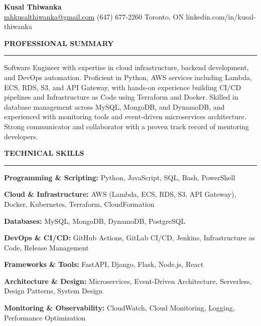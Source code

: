 \documentclass[10pt,letterpaper]{article}
\begin{document}
\begin{center}
{\LARGE\textbf{Kusal Thiwanka}}\\[3pt]
\href{mailto:mhkusalthiwanka@gmail.com}{mhkusalthiwanka@gmail.com}\hspace{2em}%
(647) 677{-}2260\hspace{2em}%
Toronto, ON\hspace{2em}
linkedin.com/in/kusal-thiwanka
\end{center}

\vspace{6pt}

\textbf{PROFESSIONAL SUMMARY}\\[-8pt]
\noindent\rule{\textwidth}{1pt}

\vspace{-2pt}

Software Engineer with expertise in cloud infrastructure, backend development, and DevOps automation. Proficient in Python, AWS services including Lambda, ECS, RDS, S3, and API Gateway, with hands-on experience building CI/CD pipelines and Infrastructure as Code using Terraform and Docker. Skilled in database management across MySQL, MongoDB, and DynamoDB, and experienced with monitoring tools and event-driven microservices architecture. Strong communicator and collaborator with a proven track record of mentoring developers.

\vspace{8pt}

\textbf{TECHNICAL SKILLS}\\[-8pt]
\noindent\rule{\textwidth}{1pt}

\vspace{-2pt}

\textbf{Programming \& Scripting:} Python, JavaScript, SQL, Bash, PowerShell

\textbf{Cloud \& Infrastructure:} AWS (Lambda, ECS, RDS, S3, API Gateway), Docker, Kubernetes, Terraform, CloudFormation

\textbf{Databases:} MySQL, MongoDB, DynamoDB, PostgreSQL

\textbf{DevOps \& CI/CD:} GitHub Actions, GitLab CI/CD, Jenkins, Infrastructure as Code, Release Management

\textbf{Frameworks \& Tools:} FastAPI, Django, Flask, Node.js, React

\textbf{Architecture \& Design:} Microservices, Event-Driven Architecture, Serverless, Design Patterns, System Design

\textbf{Monitoring \& Observability:} CloudWatch, Cloud Monitoring, Logging, Performance Optimization
\end{document}
